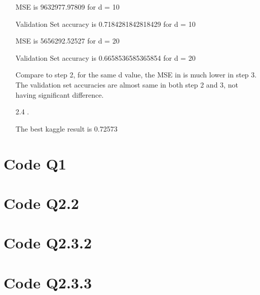 \documentclass[11pt]{article}
\begin{document}
\begin{itemize}
MSE is 9632977.97809 for d =  10

Validation Set accuracy is  0.7184281842818429 for d =  10

MSE is 5656292.52527 for d =  20

Validation Set accuracy is  0.6658536585365854 for d =  20


Compare to step 2, for the same d value, the MSE in is much lower in step 3. The validation set accuracies are almost same in both step 2 and 3, not having significant difference. 

\item[2.4].

The best kaggle result is 0.72573

\end{itemize}

\newpage
\section*{Code Q1}

\newpage
\section*{Code Q2.2}

\newpage
\section*{Code Q2.3.2}

\newpage
\section*{Code Q2.3.3}
\end{document}
